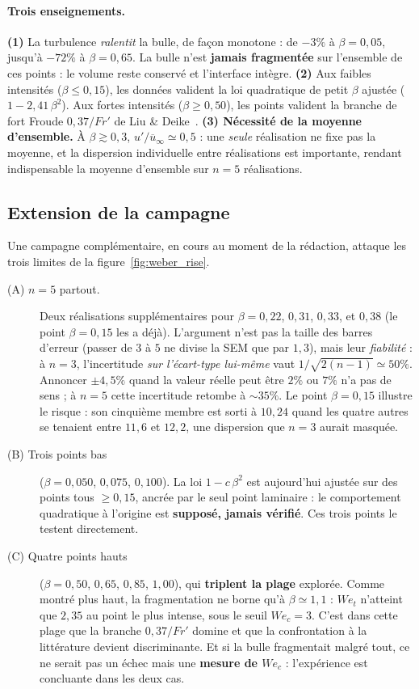 \paragraph{Trois enseignements.} \textbf{(1)} La turbulence \emph{ralentit}
la bulle, de façon monotone : de $-3\%$ à $\beta=0{,}05$, jusqu'à $-72\%$ à $\beta=0{,}65$. La bulle n'est \textbf{jamais fragmentée} sur l'ensemble de ces points : le volume reste conservé et l'interface intègre.
\textbf{(2)} Aux faibles intensités ($\beta \le 0{,}15$), les données valident la loi quadratique de petit $\beta$ ajustée ($1-2{,}41\,\beta^2$). Aux fortes intensités ($\beta \ge 0{,}50$), les points valident la branche de fort Froude $0{,}37/Fr'$ de Liu \& Deike~\cite{liu2024}.
\textbf{(3) Nécessité de la moyenne d'ensemble.} À $\beta\gtrsim0{,}3$,
$u'/\overline{u}_\infty\simeq0{,}5$ : une \emph{seule} réalisation ne fixe pas la
moyenne, et la dispersion individuelle entre réalisations est importante, rendant indispensable la moyenne d'ensemble sur $n=5$ réalisations.


\subsection{Extension de la campagne}
\label{subsec:campagne}

Une campagne complémentaire, en cours au moment de la rédaction, attaque les trois
limites de la figure~\ref{fig:weber_rise}.

\begin{description}
  \item[(A) $n=5$ partout.] Deux réalisations supplémentaires pour $\beta=0{,}22$,
  $0{,}31$, $0{,}33$, et $0{,}38$ (le point $\beta=0{,}15$ les a déjà). L'argument
  n'est pas la taille des barres d'erreur (passer de $3$ à $5$ ne divise la SEM
  que par $1{,}3$), mais leur \emph{fiabilité} : à $n=3$, l'incertitude
  \emph{sur l'écart-type lui-même} vaut $1/\sqrt{2(n-1)}\simeq50\%$. Annoncer
  \og{}$\pm4{,}5\%$\fg{} quand la valeur réelle peut être $2\%$ ou $7\%$ n'a pas de
  sens ; à $n=5$ cette incertitude retombe à ${\sim}35\%$. Le point $\beta=0{,}15$
  illustre le risque : son cinquième membre est sorti à $10{,}24$ quand les quatre
  autres se tenaient entre $11{,}6$ et $12{,}2$, une dispersion que $n=3$ aurait
  masquée.
  \item[(B) Trois points bas] ($\beta = 0{,}050$, $0{,}075$, $0{,}100$). La loi
  $1-c\,\beta^2$ est aujourd'hui ajustée sur des points tous $\ge0{,}15$, ancrée par
  le seul point laminaire : le comportement quadratique à l'origine est
  \textbf{supposé, jamais vérifié}. Ces trois points le testent directement.
  \item[(C) Quatre points hauts] ($\beta = 0{,}50$, $0{,}65$, $0{,}85$, $1{,}00$),
  qui \textbf{triplent la plage} explorée. Comme montré plus haut, la fragmentation
  ne borne qu'à $\beta\simeq1{,}1$ : $We_t$ n'atteint que $2{,}35$ au point le plus
  intense, sous le seuil $We_c=3$. C'est dans cette plage que la branche $0{,}37/Fr'$
  domine et que la confrontation à la littérature devient discriminante. Et si la
  bulle fragmentait malgré tout, ce ne serait pas un échec mais une \textbf{mesure de
  $We_c$} : l'expérience est concluante dans les deux cas.
\end{description}

